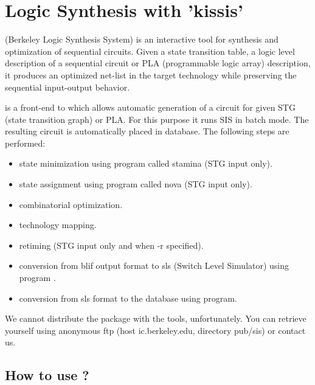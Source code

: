 
\chapter{Logic Synthesis with 'kissis'}
\label{kissis}

\protect{} (Berkeley Logic Synthesis System) 
is an interactive tool
for synthesis and optimization of sequential circuits. Given a state
transition table, a logic level description of a sequential circuit or PLA
(programmable logic array) description, it produces an optimized net-list in
the target technology while preserving the sequential input-output behavior.

\protect{} is a front-end to \protect{} which allows
automatic generation of a circuit for given STG (state transition graph) or
PLA. For this purpose it runs SIS in batch mode. The resulting circuit is
automatically placed in
\protect{} database. The following steps are performed:

\begin{itemize}
\item state minimization using program called stamina (STG input only).
\item state assignment using program called nova (STG input only).
\item combinatorial optimization.
\item technology mapping. 
\item retiming (STG input only and when -r specified).
\item conversion from blif output format to sls (Switch Level Simulator) using
program \protect{}.
\item conversion from sls format to the \protect{} database using
\protect{} program.  
\end{itemize}
 
We cannot distribute the  package with the 
tools, unfortunately. You can retrieve  yourself using
anonymous ftp (host ic.berkeley.edu, directory pub/sis) or contact us.

\section{How to use \protect{}?}

